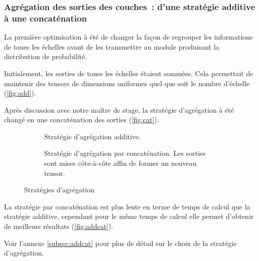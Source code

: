 \subsubsection[Agrégation des sorties des couches]{Agrégation des sorties des couches~: d'une stratégie additive à une concaténation}
La première optimisation à été de changer la façon de regrouper les informations de toues les \og échelles\fg{} avant de les transmettre au module produisant la distribution de probabilité.

Initialement, les sorties de toues les \og échelles\fg{} étaient sommées. Cela permettait de maintenir des \glspl{tensor} de dimensions uniformes quel que soit le nombre d'\og échelle\fg{} (\autoref{fig:add}).

Après discussion avec notre maître de stage, la stratégie d'agrégation à été changé en une concaténation des sorties (\autoref{fig:cat}).

\begin{figure}[ht]
	\begin{subfigure}{0.45\textwidth}
		\centering
		\scalebox{1}{}
		\caption[Stratégie d'agrégation additive]{Stratégie d'agrégation additive.\vspace{2em}}\label{fig:add}
	\end{subfigure}
	\begin{subfigure}{0.45\textwidth}
		\centering
		\scalebox{1}{}
		\caption[Stratégie d'agrégation par concaténation]{Stratégie d'agrégation par concaténation. Les sorties sont mises côte-à-côte affin de former un nouveau \gls{tensor}.}\label{fig:cat}
	\end{subfigure} 
	\caption{Stratégies d'agrégation}
\end{figure}

La stratégie par concaténation est plus lente en terme de temps de calcul que la stratégie additive, cependant pour le même temps de calcul elle permet d'obtenir de meilleurs résultats (\autoref{fig:addcat}).

Voir l'annexe \ref{subsec:addcat} pour plus de détail sur le choix de la stratégie d'agrégation. 

